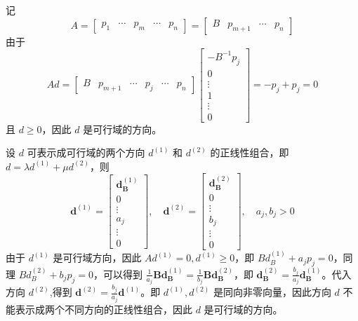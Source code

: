 \begin{solution}
    记 \[A = \begin{bmatrix}
        p_1 & \cdots & p_m & \cdots & p_n
    \end{bmatrix} = \begin{bmatrix}
        B & p_{m + 1} & \cdots & p_n
    \end{bmatrix}\]
    由于\[Ad = \begin{bmatrix}
        B & p_{m + 1} & \cdots & p_j & \cdots & p_n
    \end{bmatrix}\begin{bmatrix}
        -B^{-1}p_j \\
        0\\
        \vdots\\
        1\\
        \vdots\\
        0
    \end{bmatrix} = -p_j + p_j = 0\]
    且 $d\geqslant 0$，因此 $d$ 是可行域的方向。
    
    设 $d$ 可表示成可行域的两个方向 $d^{(1)}$ 和 $d^{(2)}$ 的正线性组合，即 $d = \lambda d^{(1)} + \mu d^{(2)}$，则
    \[\boldsymbol{d}^{(1)}=\left[\begin{array}{c}
        \boldsymbol{d}_{\mathbf{B}}^{(1)} \\
        0 \\
        \vdots \\
        a_{j} \\
        \vdots \\
        0
        \end{array}\right], \quad \boldsymbol{d}^{(2)}=\left[\begin{array}{c}
        \boldsymbol{d}_{\mathbf{B}}^{(2)} \\
        0 \\
        \vdots \\
        b_{j} \\
        \vdots \\
        0
    \end{array}\right], \quad a_{j}, b_{j}>0\]
    由于 $d^{(1)}$ 是可行域方向，因此 $Ad^{(1)} = 0, d^{(1)}\geqslant 0$，即 $Bd_B^{(1)} + a_jp_j = 0$，同理 $Bd_B^{(2)} + b_jp_j = 0$，可以得到 $\frac{1}{a_{j}} \boldsymbol{B} \boldsymbol{d}_{\boldsymbol{B}}^{(1)}=\frac{1}{b_{j}} \boldsymbol{B} \boldsymbol{d}_{\boldsymbol{B}}^{(2)}$，即 $\boldsymbol{d}_{\mathbf{B}}^{(2)}=\frac{b_{j}}{a_{j}} \boldsymbol{d}_{\mathbf{B}}^{(1)}$。代入方向 $d^{(2)}$,得到 $\boldsymbol{d}^{(2)}=\frac{b_{j}}{a_{j}} \boldsymbol{d}^{(1)}$。即 $d^{(1)},d^{(2)}$ 是同向非零向量，因此方向 $d$ 不能表示成两个不同方向的正线性组合，因此 $d$ 是可行域的方向。
\end{solution}

